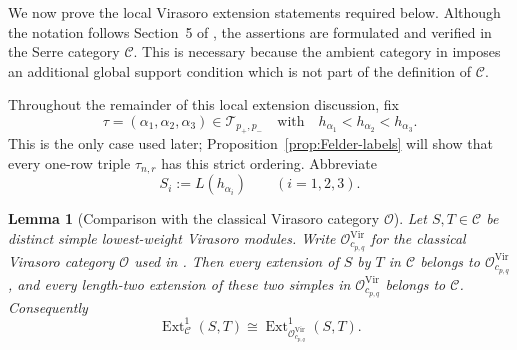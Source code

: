 \documentclass[12pt,leqno]{amsart}
\numberwithin{equation}{section}
\newtheorem{lem}[thm]{Lemma}
\newcommand{\Ext}{\operatorname{Ext}}
\begin{document}
We now prove the local Virasoro extension statements required below.
Although the notation follows Section~5 of \cite{Nakano}, the assertions
are formulated and verified in the Serre category $\mathscr C$.  This is
necessary because the ambient category in
\cite[Definition~3.14]{Nakano} imposes an additional global support
condition which is not part of the definition of $\mathscr C$.

Throughout the remainder of this local extension discussion, fix
\[
 \tau=(\alpha_1,\alpha_2,\alpha_3)\in\mathcal T_{p_+,p_-}
 \quad\text{with}\quad
 h_{\alpha_1}<h_{\alpha_2}<h_{\alpha_3}.
\]
This is the only case used later; Proposition~\ref{prop:Felder-labels}
will show that every one-row triple $\tau_{n,r}$ has this strict ordering.
Abbreviate
\[
 S_i:=L(h_{\alpha_i})\qquad(i=1,2,3).
\]

\begin{lem}[Comparison with the classical Virasoro category $\mathcal O$]
\label{lem:local-category-O}
Let $S,T\in\mathscr C$ be distinct simple lowest-weight Virasoro modules.
Write
$\mathcal O^{\mathrm{Vir}}_{c_{p,q}}$ for the classical Virasoro
category $\mathcal O$ used in \cite{BoeNakanoWiesner}.  Then every
extension of $S$ by $T$ in $\mathscr C$ belongs to
$\mathcal O^{\mathrm{Vir}}_{c_{p,q}}$, and every length-two extension
of these two simples in $\mathcal O^{\mathrm{Vir}}_{c_{p,q}}$ belongs
to $\mathscr C$.  Consequently
\[
 \Ext^1_{\mathscr C}(S,T)
 \cong
 \Ext^1_{\mathcal O^{\mathrm{Vir}}_{c_{p,q}}}(S,T).
\]
\end{lem}
\end{document}
